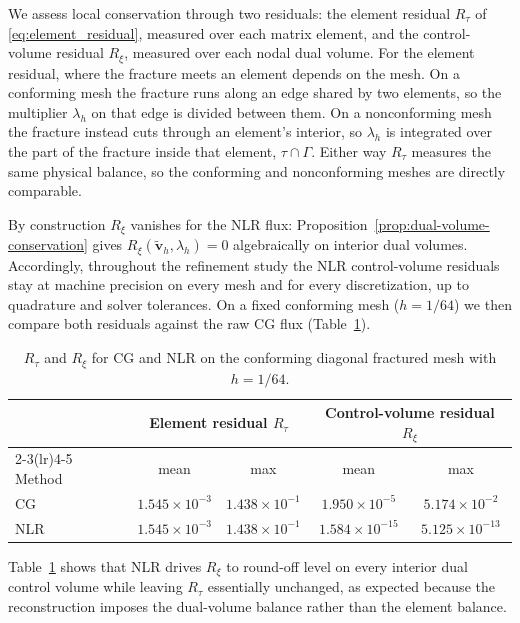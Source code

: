 \documentclass[a4paper,fleqn]{cas-sc}
\newcommand{\vflux}{\mathbf{v}}
\begin{document}

We assess local conservation through two residuals: the element residual
\(R_\tau\) of \eqref{eq:element_residual}, measured over each matrix element, and
the control-volume residual \(R_\xi\), measured over each nodal dual volume. For the
element residual, where the fracture meets an element depends on the mesh. On a
conforming mesh the fracture runs along an edge shared by two elements, so the
multiplier \(\lambda_h\) on that edge is divided between them. On a nonconforming
mesh the fracture instead cuts through an element's interior, so \(\lambda_h\) is
integrated over the part of the fracture inside that element, \(\tau\cap\Gamma\).
Either way \(R_\tau\) measures the same physical balance, so the conforming and
nonconforming meshes are directly comparable.

By construction \(R_\xi\) vanishes for the NLR flux:
Proposition~\ref{prop:dual-volume-conservation} gives
\(R_\xi(\widetilde{\vflux}_h,\lambda_h)=0\) algebraically on interior dual
volumes. Accordingly, throughout the refinement study the NLR control-volume
residuals stay at machine precision on every mesh and for every discretization,
up to quadrature and solver tolerances. On a fixed conforming mesh
(\(h=1/64\)) we then compare both residuals against the raw CG flux
(Table~\ref{tab:single_fracture_nlr_results}).

\begin{table}[!htbp]
\centering
\caption{\(R_\tau\) and \(R_\xi\) for CG and NLR on the conforming diagonal
fractured mesh with \(h=1/64\).}
\label{tab:single_fracture_nlr_results}
\begin{tabular}{lcccc}
\toprule
 & \multicolumn{2}{c}{Element residual \(R_\tau\)}
 & \multicolumn{2}{c}{Control-volume residual \(R_\xi\)} \\
\cmidrule(lr){2-3}\cmidrule(lr){4-5}
Method & mean & max & mean & max \\
\midrule
CG
& \(1.545\times10^{-3}\)
& \(1.438\times10^{-1}\)
& \(1.950\times10^{-5}\)
& \(5.174\times10^{-2}\) \\
NLR
& \(1.545\times10^{-3}\)
& \(1.438\times10^{-1}\)
& \(1.584\times10^{-15}\)
& \(5.125\times10^{-13}\) \\
\bottomrule
\end{tabular}
\end{table}

Table~\ref{tab:single_fracture_nlr_results} shows that NLR drives \(R_\xi\) to
round-off level on every interior dual control volume while leaving \(R_\tau\)
essentially unchanged, as expected because the reconstruction imposes the
dual-volume balance rather than the element balance.
\end{document}
